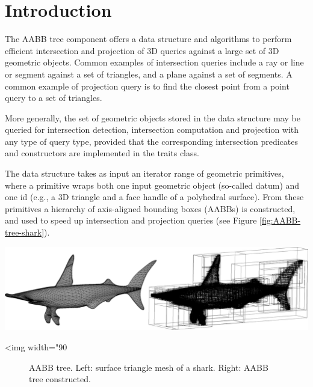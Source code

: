 \section{Introduction}
\label{AABB_tree_section_intro}

The AABB tree component offers a data structure and algorithms to perform efficient intersection and projection of 3D queries against a large set of 3D geometric objects. Common examples of intersection queries include a ray or line or segment against a set of triangles, and a plane against a set of segments. A common example of projection query is to find the closest point from a point query to a set of triangles.

More generally, the set of geometric objects stored in the data structure may be queried for intersection detection, intersection computation and projection with any type of query type, provided that the corresponding intersection predicates and constructors are implemented in the traits class. 

The data structure takes as input an iterator range of geometric primitives, where a primitive wraps both one input geometric object (so-called datum) and one id (e.g., a 3D triangle and a face handle of a polyhedral surface). From these primitives a hierarchy of axis-aligned bounding boxes (AABBs) is constructed, and used to speed up intersection and projection queries (see Figure \ref{fig:AABB-tree-shark}). 

\begin{center}
    \label{fig:AABB-tree-shark}
    \begin{ccTexOnly}
      \includegraphics[width=1.0\textwidth]{AABB_tree/shark}
    \end{ccTexOnly}
    \begin{ccHtmlOnly}
        <img width="90%
    \end{ccHtmlOnly}
    \begin{figure}[h]
        \caption{AABB tree.
                 Left: surface triangle mesh of a shark.
                 Right: AABB tree constructed.}
    \end{figure}
\end{center}

